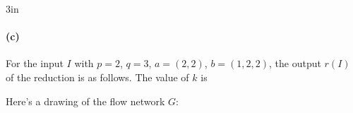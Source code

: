 \begin{answerBox}{3in}   %

  \paragraph{(c)}


  For the input $I$ with $p=2$, $q=3$, $a=(2,2)$, $b=(1,2,2)$, the output $r(I)$ of the reduction is as follows.
  The value of $k$ is

  Here's a drawing of the flow network $G$:

  \bigskip
  
  \begin{center}

    \begin{blue}

      \REPLACEME
      


      







    \end{blue}
  \end{center}

\end{answerBox}

